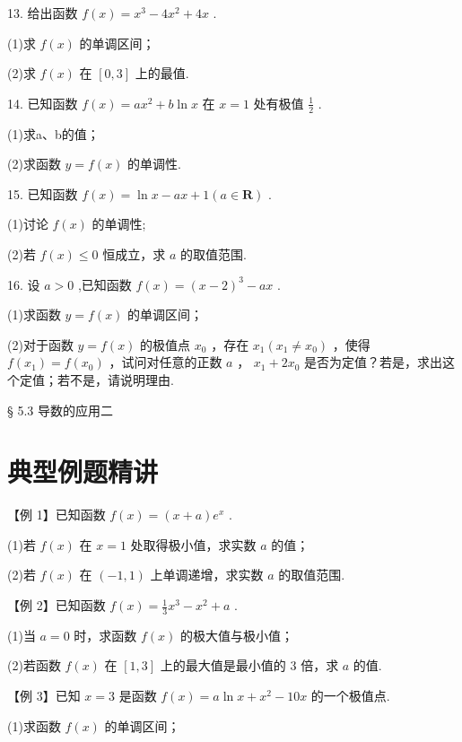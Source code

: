 13. 给出函数 $f\left( x\right)  = {x}^{3} - 4{x}^{2} + {4x}$ .

(1)求 $f\left( x\right)$ 的单调区间；

(2)求 $f\left( x\right)$ 在 $\left\lbrack  {0,3}\right\rbrack$ 上的最值.

14. 已知函数 $f\left( x\right)  = a{x}^{2} + b\ln x$ 在 $x = 1$ 处有极值 $\frac{1}{2}$ .

(1)求a、b的值；

(2)求函数 $y = f\left( x\right)$ 的单调性.

15. 已知函数 $f\left( x\right)  = \ln x - {ax} + 1\left( {a \in  \mathbf{R}}\right)$ .

(1)讨论 $f\left( x\right)$ 的单调性;

(2)若 $f\left( x\right)  \leq  0$ 恒成立，求 $a$ 的取值范围.

16. 设 $a > 0$ ,已知函数 $f\left( x\right)  = {\left( x - 2\right) }^{3} - {ax}$ .

(1)求函数 $y = f\left( x\right)$ 的单调区间；

(2)对于函数 $y = f\left( x\right)$ 的极值点 ${x}_{0}$ ，存在 ${x}_{1}\left( {{x}_{1} \neq  {x}_{0}}\right)$ ，使得 $f\left( {x}_{1}\right)  = f\left( {x}_{0}\right)$ ，试问对任意的正数 $a$ ， ${x}_{1} + 2{x}_{0}$ 是否为定值？若是，求出这个定值；若不是，请说明理由.

§ 5.3 导数的应用二

\section*{典型例题精讲}

【例 1】已知函数 $f\left( x\right)  = \left( {x + a}\right) {{e}}^{x}$ .

(1)若 $f\left( x\right)$ 在 $x = 1$ 处取得极小值，求实数 $a$ 的值；

(2)若 $f\left( x\right)$ 在 $\left( {-1,1}\right)$ 上单调递增，求实数 $a$ 的取值范围.

【例 2】已知函数 $f\left( x\right)  = \frac{1}{3}{x}^{3} - {x}^{2} + a$ .

(1)当 $a = 0$ 时，求函数 $f\left( x\right)$ 的极大值与极小值；

(2)若函数 $f\left( x\right)$ 在 $\left\lbrack  {1,3}\right\rbrack$ 上的最大值是最小值的 3 倍，求 $a$ 的值.

【例 3】已知 $x = 3$ 是函数 $f\left( x\right)  = a\ln x + {x}^{2} - {10x}$ 的一个极值点.

(1)求函数 $f\left( x\right)$ 的单调区间；

